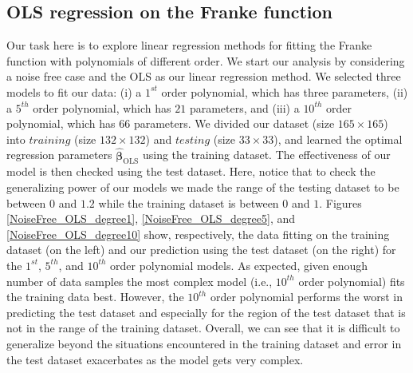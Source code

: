 \documentclass[a4paper]{article}
\begin{document}
\subsection{OLS regression on the Franke function}
Our task here is to explore linear regression methods for fitting the Franke function with polynomials of different order. We start our analysis by considering a noise free case and the OLS as our linear regression method. We selected three models to fit our data: (i) a $1^{st}$ order polynomial, which has three parameters, (ii) a $5^{th}$ order polynomial, which has $21$ parameters, and (iii) a $10^{th}$ order polynomial, which has $66$ parameters. We divided our dataset (size $165\times165$) into $training$ (size $132\times132$) and $testing$ (size $33\times33$), and learned the optimal regression parameters $\hat{\boldsymbol{\beta}}_{\text{OLS}}$ using the training dataset. The effectiveness of our model is then checked using the test dataset. Here, notice that to check the generalizing power of our models we made the range of the testing dataset to be between $0$ and $1.2$ while the training dataset is between $0$ and $1$. Figures \ref{NoiseFree_OLS_degree1}, \ref{NoiseFree_OLS_degree5}, and \ref{NoiseFree_OLS_degree10} show, respectively, the data fitting on the training dataset (on the left) and our prediction using the test dataset (on the right) for the $1^{st}$, $5^{th}$, and $10^{th}$ order polynomial models. As expected, given enough number of data samples the most complex model (i.e., $10^{th}$ order polynomial) fits the training data best. However, the $10^{th}$ order polynomial performs the worst in predicting the test dataset and especially for the region of the test dataset that is not in the range of the training dataset. Overall, we can see that it is difficult to generalize beyond the situations encountered in the training dataset and error in the test dataset exacerbates as the model gets very complex.
\end{document}
